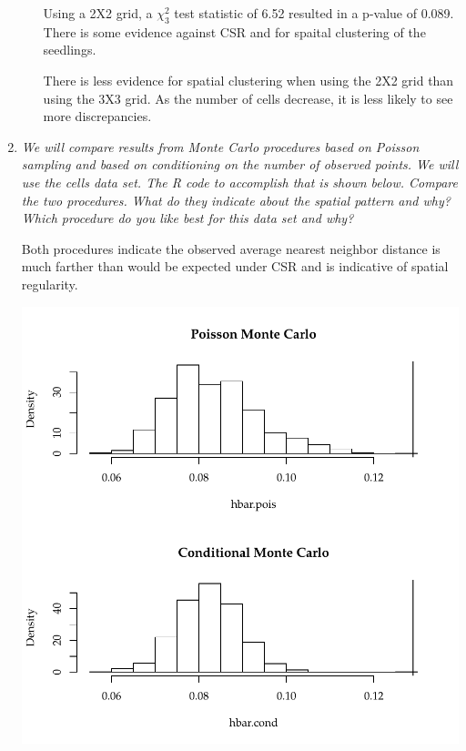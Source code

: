 \documentclass{article}\usepackage[]{graphicx}\usepackage[]{color}
\makeatletter
\def\maxwidth{ %
  \ifdim\Gin@nat@width>\linewidth
    \linewidth
  \else
    \Gin@nat@width
  \fi
}
\newenvironment{knitrout}{}{} %
\makeatother
\begin{document}
\begin{enumerate}
\begin{enumerate}
Using a 2X2 grid, a $\chi^{2}_{3}$ test statistic of 6.52 resulted in a p-value of 0.089. There is some evidence against CSR and for spaital clustering of the seedlings.

There is less evidence for spatial clustering when using the 2X2 grid than using the 3X3 grid. As the number of cells decrease, it is less likely to see more discrepancies.


\end{enumerate}

\item {\it We will compare results from Monte Carlo procedures based on Poisson sampling and based on conditioning on the number of observed points. We will use the cells data set. The R code to accomplish that is shown below. Compare the two procedures. What do they indicate about the spatial pattern and why? Which procedure do you like best for this data set and why?}

Both procedures indicate the observed average nearest neighbor distance is much farther than would be expected under CSR and is indicative of spatial regularity.

\begin{knitrout}\footnotesize
{}\color{fgcolor}

{\centering \includegraphics[width=\maxwidth]{figure/prob3-1} 

}
\end{knitrout}
\end{enumerate}
\end{document}
